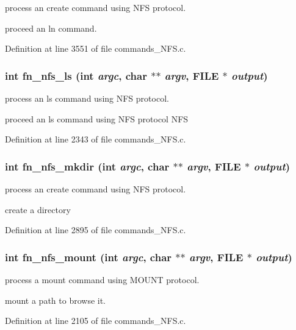 process an create command using NFS protocol.

proceed an ln command. 

Definition at line 3551 of file commands\_\-NFS.c.
\subsubsection[{fn\_\-nfs\_\-ls}]{\setlength{\rightskip}{0pt plus 5cm}int fn\_\-nfs\_\-ls (int {\em argc}, \/  char $\ast$$\ast$ {\em argv}, \/  FILE $\ast$ {\em output})}\label{commands_8h_4d233995059a84db95c99ebc1e773d51}


process an ls command using NFS protocol.

proceed an ls command using NFS protocol NFS 

Definition at line 2343 of file commands\_\-NFS.c.
\subsubsection[{fn\_\-nfs\_\-mkdir}]{\setlength{\rightskip}{0pt plus 5cm}int fn\_\-nfs\_\-mkdir (int {\em argc}, \/  char $\ast$$\ast$ {\em argv}, \/  FILE $\ast$ {\em output})}\label{commands_8h_0e472c68ced403215582ac08170cf489}


process an create command using NFS protocol.

create a directory 

Definition at line 2895 of file commands\_\-NFS.c.
\subsubsection[{fn\_\-nfs\_\-mount}]{\setlength{\rightskip}{0pt plus 5cm}int fn\_\-nfs\_\-mount (int {\em argc}, \/  char $\ast$$\ast$ {\em argv}, \/  FILE $\ast$ {\em output})}\label{commands_8h_9f9ce437f72847bc50a8b27738d0792c}


process a mount command using MOUNT protocol.

mount a path to browse it. 

Definition at line 2105 of file commands\_\-NFS.c.

